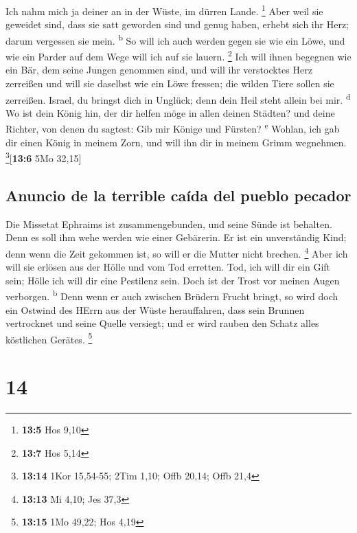  Ich nahm mich ja deiner an in der Wüste, im dürren Lande.
\footnote{\textbf{13:5} Hos 9,10}  Aber weil sie geweidet
sind, dass sie satt geworden sind und genug haben, erhebt sich ihr Herz;
darum vergessen sie mein. \textsuperscript{b}  So will ich
auch werden gegen sie wie ein Löwe, und wie ein Parder auf dem Wege will
ich auf sie lauern. \footnote{\textbf{13:7} Hos 5,14}  Ich
will ihnen begegnen wie ein Bär, dem seine Jungen genommen sind, und
will ihr verstocktes Herz zerreißen und will sie daselbst wie ein Löwe
fressen; die wilden Tiere sollen sie zerreißen.  Israel,
du bringst dich in Unglück; denn dein Heil steht allein bei mir.
\textsuperscript{d}  Wo ist dein König hin, der dir
helfen möge in allen deinen Städten? und deine Richter, von denen du
sagtest: Gib mir Könige und Fürsten? \textsuperscript{e} 
Wohlan, ich gab dir einen König in meinem Zorn, und will ihn dir in
meinem Grimm wegnehmen. \footnote{\textbf{13:14} 1Kor 15,54-55; 2Tim
  1,10; Offb 20,14; Offb 21,4}{[}\textbf{13:6} 5Mo 32,15{]}

\hypertarget{anuncio-de-la-terrible-cauxedda-del-pueblo-pecador}{%
\subsection{Anuncio de la terrible caída del pueblo
pecador}\label{anuncio-de-la-terrible-cauxedda-del-pueblo-pecador}}

 Die Missetat Ephraims ist zusammengebunden, und seine
Sünde ist behalten.  Denn es soll ihm wehe werden wie
einer Gebärerin. Er ist ein unverständig Kind; denn wenn die Zeit
gekommen ist, so will er die Mutter nicht brechen. \footnote{\textbf{13:13}
  Mi 4,10; Jes 37,3}  Aber ich will sie erlösen aus der
Hölle und vom Tod erretten. Tod, ich will dir ein Gift sein; Hölle ich
will dir eine Pestilenz sein. Doch ist der Trost vor meinen Augen
verborgen. \textsuperscript{b}  Denn wenn er auch
zwischen Brüdern Frucht bringt, so wird doch ein Ostwind des HErrn aus
der Wüste herauffahren, dass sein Brunnen vertrocknet und seine Quelle
versiegt; und er wird rauben den Schatz alles köstlichen Gerätes.
\footnote{\textbf{13:15} 1Mo 49,22; Hos 4,19}

\hypertarget{section-13}{%
\section{14}\label{section-13}}

